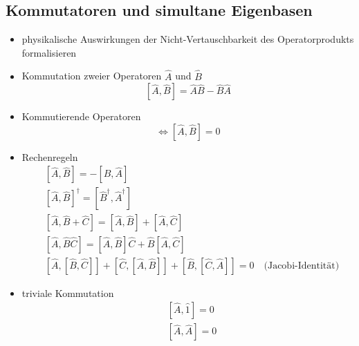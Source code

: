 \documentclass[10pt,article,colorback,accentcolor=tud9d]{scrartcl}
\begin{document}
\subsection{Kommutatoren und simultane Eigenbasen}
\begin{itemize}
	\item physikalische Auswirkungen der Nicht-Vertauschbarkeit des Operatorprodukts formalisieren 
  \item Kommutation zweier Operatoren $\hat{A}$ und $\hat{B}$
    \begin{equation}
    \left[\hat{A},\hat{B}\right]=\hat{A}\hat{B}-\hat{B}\hat{A}
    \end{equation}
  \item Kommutierende Operatoren
    \begin{equation}
    \Leftrightarrow \left[\hat{A},\hat{B}\right]=0
    \end{equation}
  \item Rechenregeln
    \begin{equation}
    \begin{aligned}
      &\left[\hat{A},\hat{B}\right]=-\left[\hat{B},\hat{A}\right]\\
      &\left[\hat{A},\hat{B}\right]^\dagger=\left[\hat{B}^\dagger,\hat{A}^\dagger\right]\\
      &\left[\hat{A},\hat{B}+\hat{C}\right] =\left[\hat{A},\hat{B}\right]+\left[\hat{A},\hat{C}\right]\\
      &\left[\hat{A},\hat{B}\hat{C}\right]=\left[\hat{A},\hat{B}\right]\hat{C}+\hat{B}\left[\hat{A},\hat{C}\right]\\
      &\left[\hat{A},\left[\hat{B},\hat{C}\right]\right]+
        \left[\hat{C},\left[\hat{A},\hat{B}\right]\right]+
        \left[\hat{B},\left[\hat{C},\hat{A}\right]\right]=0
        \quad\text{(Jacobi-Identität)}
    \end{aligned}
    \end{equation}
  \item triviale Kommutation
    \begin{equation}
    \begin{aligned}
      &\left[\hat{A},\hat{1}\right]=0\\
      &\left[\hat{A},\hat{A}\right]=0
    \end{aligned}
    \end{equation}
\end{itemize}
\end{document}
